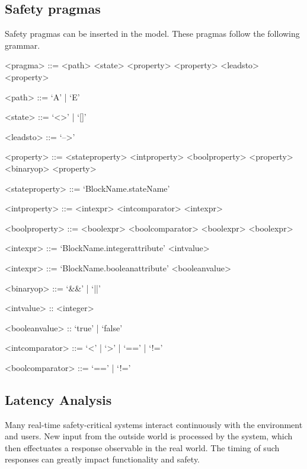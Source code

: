 \documentclass[12pt]{article}
\begin{document}
\subsection{Safety pragmas}
Safety pragmas can be inserted in the model. These pragmas follow the following grammar.

\setlength{\grammarparsep}{20pt plus 1pt minus 1pt} %
\setlength{\grammarindent}{12em} %

\begin{grammar}

<pragma> ::= <path> <state> <property> 
\alt <property> <leadsto> <property> 

<path> ::=  `A'  |   `E' 

<state> ::=  `<>'  |   `[]' 

<leadsto> ::=  `-->'  

<property> ::= <stateproperty>
\alt <intproperty>
\alt <boolproperty>
\alt <property> <binaryop> <property>

<stateproperty> ::= `BlockName.stateName' 

<intproperty> ::= <intexpr> <intcomparator> <intexpr>

<boolproperty> ::= <boolexpr> <boolcomparator> <boolexpr>
\alt <boolexpr>



<intexpr> ::= `BlockName.integerattribute' 
\alt <intvalue>

<intexpr> ::= `BlockName.booleanattribute' 
\alt <booleanvalue>


<binaryop>  ::=  `&&'  |   `||' 

<intvalue> :: <integer>

<booleanvalue> :: `true' | `false'

<intcomparator>  ::=  `<'  |   `>'  | `=='  |   `!=' 

<boolcomparator> ::=  `=='  |   `!=' 

\end{grammar}

\subsection{Latency Analysis}


Many real-time safety-critical systems interact continuously with the environment and users. New input from the outside world is processed by the system, which then effectuates a response observable in the real world. The timing of such responses can greatly impact functionality and safety.
\end{document}

